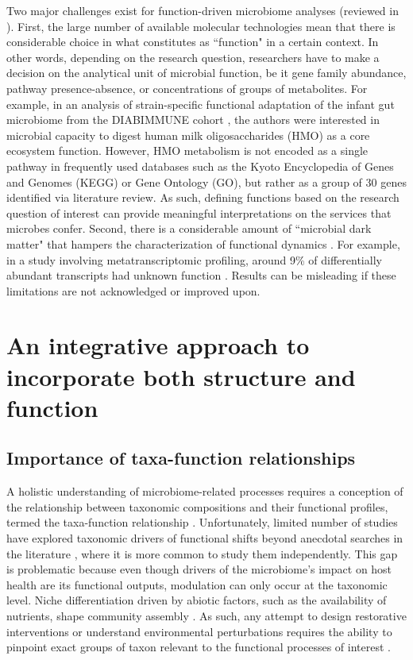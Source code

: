 Two major challenges exist for function-driven microbiome analyses (reviewed in \cite{heintz-buschart2018human}). First, the large number of available molecular technologies mean that there is considerable choice in what constitutes as ``function" in a certain context. In other words, depending on the research question, researchers have to make a decision on the analytical unit of microbial function, be it gene family abundance, pathway presence-absence, or concentrations of groups of metabolites. For example, in an analysis of strain-specific functional adaptation of the infant gut microbiome from the DIABIMMUNE cohort \cite{vatanen2018human}, the authors were interested in microbial capacity to digest human milk oligosaccharides (HMO) as a core ecosystem function. However, HMO metabolism is not encoded as a single pathway in frequently used databases such as the Kyoto Encyclopedia of Genes and Genomes (KEGG) or Gene Ontology (GO), but rather as a group of 30 genes identified via literature review. As such, defining functions based on the research question of interest can provide meaningful interpretations on the services that microbes confer. Second, there is a considerable amount of ``microbial dark matter" that hampers the characterization of functional dynamics \cite{jiao2021microbial}. For example, in a study involving metatranscriptomic profiling, around 9\% of differentially abundant transcripts had unknown function \cite{heintz-buschart2017integrated}. Results can be misleading if these limitations are not acknowledged or improved upon. 

\section{An integrative approach to incorporate both structure and function}

\subsection{Importance of taxa-function relationships}

A holistic understanding of microbiome-related processes requires a conception of the relationship between taxonomic compositions and their functional profiles, termed the taxa-function relationship \cite{langille2018exploring, heintz-buschart2018human}. Unfortunately, limited number of studies have explored taxonomic drivers of functional shifts beyond anecdotal searches in the literature \cite{manor2017systematic}, where it is more common to study them independently. This gap is problematic because even though drivers of the microbiome's impact on host health are its functional outputs, modulation can only occur at the taxonomic level. Niche differentiation driven by abiotic factors, such as the availability of nutrients, shape community assembly \cite{pereira2017microbial}. As such, any attempt to design restorative interventions or understand environmental perturbations requires the ability to pinpoint exact groups of taxon relevant to the functional processes of interest \cite{wong2019new}.   

